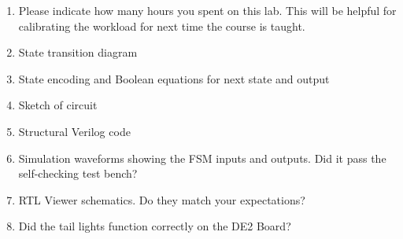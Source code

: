 \documentclass{../../e85}
\date{2019 February 18 (Monday)}
\author{}
\begin{document}
\begin{enumerate}
\item Please indicate how many hours you spent on this lab.  This will
  be helpful for calibrating the workload for next time the course is
  taught.

  \begin{solution}

  \end{solution}

\item State transition diagram

  \begin{solution}

  \end{solution}

\item State encoding and Boolean equations for next state and output

  \begin{solution}

  \end{solution}

\item Sketch of circuit

  \begin{solution}

  \end{solution}

\item Structural Verilog code

  \begin{solution}

  \end{solution}

\item Simulation waveforms showing the FSM inputs and outputs.  Did it
  pass the self-checking test bench?

  \begin{solution}

  \end{solution}

\item RTL Viewer schematics.  Do they match your expectations?

  \begin{solution}

  \end{solution}

\item Did the tail lights function correctly on the DE2 Board?

  \begin{solution}

  \end{solution}
\end{enumerate}
\end{document}
